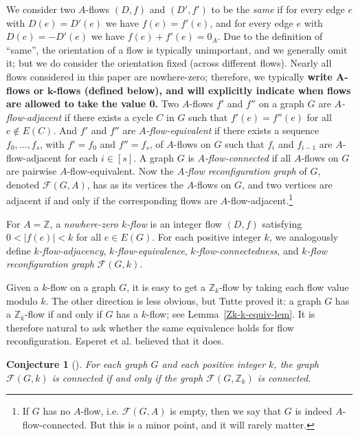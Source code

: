 \documentclass[a4paper,12pt]{article}
\theoremstyle{plain}
\newtheorem{conjA}[thmA]{Conjecture}
\theoremstyle{definition}
\newcommand{\Z}{\mathbb{Z}}
\newcommand\F{\mathcal{F}}
\begin{document}
We consider two $A$-flows $(D,f)$ and $(D',f')$ to be the \emph{same} if for every edge $e$ with $D(e)=D'(e)$ we have $f(e)=f'(e)$, and for every edge $e$ with $D(e)=-D'(e)$ we have $f(e)+f'(e)=0_A$.
Due to the definition of ``same'', the orientation of a flow is typically unimportant, and we generally omit it; but we do consider the orientation fixed (across different flows). 
Nearly all flows considered in this paper are nowhere-zero; therefore, we typically \textbf{write $\bm{A}$-flows or $\bm{k}$-flows (defined below), and will explicitly indicate when flows are allowed to take the value 0.}
Two $A$-flows $f'$ and $f''$ on a graph $G$ are \emph{$A$-flow-adjacent} if there exists a cycle $C$ in $G$ such that $f'(e)=f''(e)$ for all $e\notin E(C)$.
And $f'$ and $f''$ are \emph{$A$-flow-equivalent} if there exists a sequence $f_0,\ldots,f_s$, with $f'=f_0$ and $f''=f_s$, of $A$-flows on $G$ such that $f_i$ and $f_{i-1}$ are $A$-flow-adjacent for each $i\in [s]$.  A graph $G$ is \emph{$A$-flow-connected} if all $A$-flows on $G$ are pairwise $A$-flow-equivalent.  
Now the \emph{$A$-flow reconfiguration graph} of $G$, denoted $\mathcal{F}(G,A)$, has as its vertices the 
$A$-flows on $G$, and two vertices are adjacent if and only if the corresponding flows are $A$-flow-adjacent.\footnote{If $G$ has no $A$-flow, i.e. $\F(G,A)$ is empty, then we say that $G$ is indeed $A$-flow-connected.  But this is a minor point, and it will rarely matter.} 

For $A=\mathbb Z$, a \emph{nowhere-zero $k$-flow} is an integer flow $(D,f)$ satisfying $0<|f(e)|<k$ for all $e\in E(G)$.
For each positive integer $k$, we analogously define \emph{$k$-flow-adjacency}, \emph{$k$-flow-equivalence}, \emph{$k$-flow-connectedness}, and \emph{$k$-flow reconfiguration graph} $\mathcal{F}(G,k)$.  

Given a $k$-flow on a graph $G$, it is easy to get a $\Z_k$-flow by taking each flow value modulo $k$.  The other direction is less obvious, but Tutte proved it: a graph $G$ has a $\Z_k$-flow if and only if $G$ has a $k$-flow; see Lemma~\ref{Zk-k-equiv-lem}. It is therefore natural to ask whether the same equivalence holds for flow reconfiguration. Esperet et al. believed that it does.

\begin{conjA}[\cite{esperet-et-al}]
For each graph $G$ and each positive integer $k$, the graph $\F(G,k)$ is connected if and only if the graph $\F(G,\Z_k)$ is connected.
\label{conjA}
\end{conjA}
\end{document}
